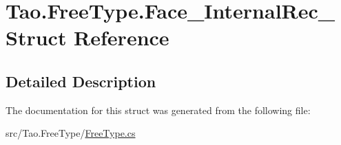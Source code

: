 \hypertarget{struct_tao_1_1_free_type_1_1_face___internal_rec__}{
\section{Tao.FreeType.Face\_\-InternalRec\_\- Struct Reference}
\label{struct_tao_1_1_free_type_1_1_face___internal_rec__}
}


\subsection{Detailed Description}


The documentation for this struct was generated from the following file:\begin{DoxyCompactItemize}
\item 
src/Tao.FreeType/\hyperlink{_free_type_8cs}{FreeType.cs}\end{DoxyCompactItemize}
